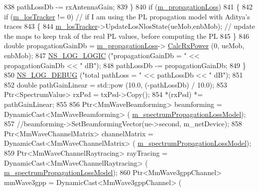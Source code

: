 \begin{DoxyCode}
838                   pathLossDb -= rxAntennaGain;
839                 \}
840                 \textcolor{keywordflow}{if} (\hyperlink{classns3_1_1MmWavePhy_ae16faa8d6eeee2cc0cc712b0ccb62064}{m\_propagationLoss})
841                 \{
842                         \textcolor{keywordflow}{if} (\hyperlink{classns3_1_1MmWavePhy_a614158bb98ad735dc185e0d6eccc51a0}{m\_losTracker} != 0) \textcolor{comment}{// if I am using the PL propagation model with
       Aditya's traces}
843                         \{
844                                 \hyperlink{classns3_1_1MmWavePhy_a614158bb98ad735dc185e0d6eccc51a0}{m\_losTracker}->UpdateLosNlosState(ueMob,enbMob); \textcolor{comment}{// update the
       maps to keep trak of the real PL values, before computing the PL}
845                         \}
846                   \textcolor{keywordtype}{double} propagationGainDb = \hyperlink{classns3_1_1MmWavePhy_ae16faa8d6eeee2cc0cc712b0ccb62064}{m\_propagationLoss}->
      \hyperlink{classns3_1_1PropagationLossModel_a8b42564e9b03e2197f17aab6692c4fee}{CalcRxPower} (0, ueMob, enbMob);
847                   \hyperlink{group__logging_ga88acd260151caf2db9c0fc84997f45ce}{NS\_LOG\_LOGIC} (\textcolor{stringliteral}{"propagationGainDb = "} << propagationGainDb << \textcolor{stringliteral}{" dB"});
848                   pathLossDb -= propagationGainDb;
849                 \}                    
850                 \hyperlink{group__logging_ga413f1886406d49f59a6a0a89b77b4d0a}{NS\_LOG\_DEBUG} (\textcolor{stringliteral}{"total pathLoss = "} << pathLossDb << \textcolor{stringliteral}{" dB"});
851 
852                 \textcolor{keywordtype}{double} pathGainLinear = std::pow (10.0, (-pathLossDb) / 10.0);
853                 Ptr<SpectrumValue> rxPsd = txPsd->Copy();
854                 *(rxPsd) *= pathGainLinear;              
855 
856                 Ptr<MmWaveBeamforming> beamforming = DynamicCast<MmWaveBeamforming> (
      \hyperlink{classns3_1_1MmWavePhy_a3d7feea996066a51496915c8c232daa4}{m\_spectrumPropagationLossModel});
857                 \textcolor{comment}{//beamforming->SetBeamformingVector(ue->second, m\_netDevice);}
858                 Ptr<MmWaveChannelMatrix> channelMatrix = DynamicCast<MmWaveChannelMatrix> (
      \hyperlink{classns3_1_1MmWavePhy_a3d7feea996066a51496915c8c232daa4}{m\_spectrumPropagationLossModel});
859                 Ptr<MmWaveChannelRaytracing> rayTracing = DynamicCast<MmWaveChannelRaytracing> (
      \hyperlink{classns3_1_1MmWavePhy_a3d7feea996066a51496915c8c232daa4}{m\_spectrumPropagationLossModel});
860                 Ptr<MmWave3gppChannel> mmWave3gpp = DynamicCast<MmWave3gppChannel> (

\end{DoxyCode}
